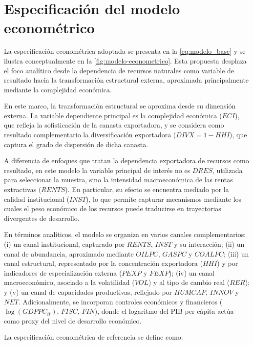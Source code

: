 \documentclass[../../PTFM.tex]{subfiles}
\begin{document}
	\section{Especificación del modelo econométrico}
	\label{sec:modelo-econometrico}


	La especificación econométrica adoptada se presenta en la \autoref{eq:modelo_base} y se ilustra conceptualmente en la \autoref{fig:modelo-econometrico}. Esta propuesta desplaza el foco analítico desde la dependencia de recursos naturales como variable de resultado hacia la transformación estructural externa, aproximada principalmente mediante la complejidad económica.

	En este marco, la transformación estructural se aproxima desde su dimensión externa. La variable dependiente principal es la complejidad económica ($ECI$), que refleja la sofisticación de la canasta exportadora, y se considera como resultado complementario la diversificación exportadora ($DIVX=1-HHI$), que captura el grado de dispersión de dicha canasta.

	A diferencia de enfoques que tratan la dependencia exportadora de recursos como resultado, en este modelo la variable principal de interés no es $DRES$, utilizada para seleccionar la muestra, sino la intensidad macroeconómica de las rentas extractivas ($RENTS$). En particular, su efecto se encuentra mediado por la calidad institucional ($INST$), lo que permite capturar mecanismos mediante los cuales el peso económico de los recursos puede traducirse en trayectorias divergentes de desarrollo.

	En términos analíticos, el modelo se organiza en varios canales complementarios: (i) un canal institucional, capturado por $RENTS$, $INST$ y su interacción; (ii) un canal de abundancia, aproximado mediante $OILPC$, $GASPC$ y $COALPC$; (iii) un canal estructural, representado por la concentración exportadora ($HHI$) y por indicadores de especialización externa ($PEXP$ y $FEXP$); (iv) un canal macroeconómico, asociado a la volatilidad ($VOL$) y al tipo de cambio real ($RER$); y (v) un canal de capacidades productivas, reflejado por $HUMCAP$, $INNOV$ y $NET$. Adicionalmente, se incorporan controles económicos y financieros ($\log(GDPPC_{it})$, $FISC$, $FIN$), donde el logaritmo del PIB per cápita actúa como proxy del nivel de desarrollo económico.

	La especificación econométrica de referencia se define como:
\end{document}
